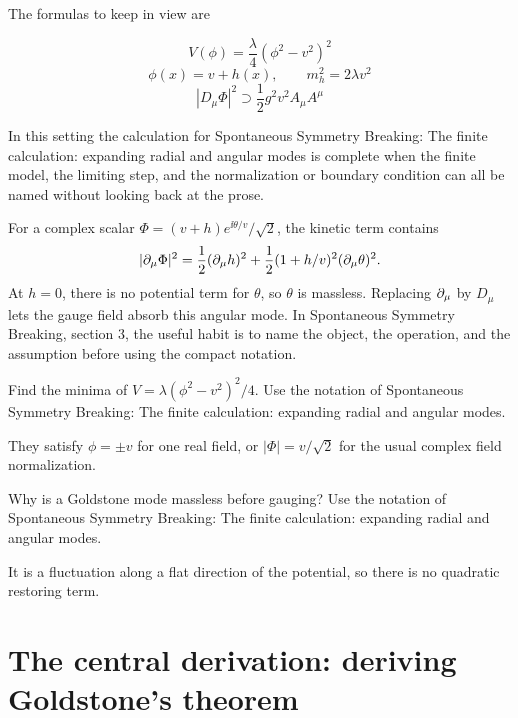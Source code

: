 The formulas to keep in view are

\[
  V(\phi)=\frac{\lambda}{4}(\phi^2-v^2)^2
\]
\[
  \phi(x)=v+h(x),\qquad m_h^2=2\lambda v^2
\]
\[
  |D_\mu\Phi|^2\supset \frac12g^2v^2A_\mu A^\mu
\]

In this setting the calculation for Spontaneous Symmetry Breaking: The finite calculation: expanding radial and angular modes is complete when the finite model, the limiting step, and the normalization or boundary condition can all be named without looking back at the prose.




\begin{example}
For a complex scalar \(\Phi=(v+h)e^{\ii\theta/v}/\sqrt2\), the kinetic term contains
\[
  |\partial_\mu\Phi|^2=\frac12(\partial_\mu h)^2+\frac12(1+h/v)^2(\partial_\mu\theta)^2.
\]
At \(h=0\), there is no potential term for \(\theta\), so \(\theta\) is massless.  Replacing \(\partial_\mu\) by \(D_\mu\) lets the gauge field absorb this angular mode.  In Spontaneous Symmetry Breaking, section 3, the useful habit is to name the object, the operation, and the assumption before using the compact notation.
\end{example}



\begin{exercise}
Find the minima of \(V=\lambda(\phi^2-v^2)^2/4\).  Use the notation of Spontaneous Symmetry Breaking: The finite calculation: expanding radial and angular modes.
\begin{answer}
They satisfy \(\phi=\pm v\) for one real field, or \(|\Phi|=v/\sqrt2\) for the usual complex field normalization.
\end{answer}
\end{exercise}

\begin{exercise}
Why is a Goldstone mode massless before gauging?  Use the notation of Spontaneous Symmetry Breaking: The finite calculation: expanding radial and angular modes.
\begin{answer}
It is a fluctuation along a flat direction of the potential, so there is no quadratic restoring term.
\end{answer}
\end{exercise}



\section{The central derivation: deriving Goldstone's theorem}

